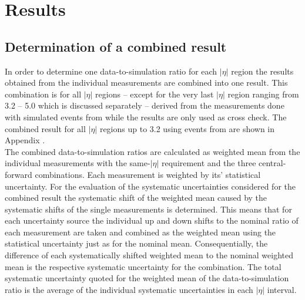 \section{Results}
\label{sec:jer_results}

\subsection{Determination of a combined result}
\label{subsec:jer_combination}
In order to determine one data-to-simulation ratio for each $|\eta|$ region the results obtained from the individual measurements are combined into one result. This combination is for all $|\eta|$ regions -- except for the very last $|\eta|$ region ranging from 3.2 -- 5.0 which is discussed separately -- derived from the measurements done with simulated events from \pythia while the \herwig results are only used as cross check. The combined result for all $|\eta|$ regions up to 3.2 using events from \herwig are shown in Appendix .\\
The combined data-to-simulation ratios are calculated as weighted mean from the individual measurements with the same-$|\eta|$ requirement and the three central-forward combinations. Each measurement is weighted by its' statistical uncertainty. For the evaluation of the systematic uncertainties considered for the combined result the systematic shift of the weighted mean caused by the systematic shifts of the single measurements is determined. This means that for each uncertainty source the individual up and down shifts to the nominal ratio of each measurement are taken and combined as the weighted mean using the statistical uncertainty just as for the nominal mean. Consequentially, the difference of each systematically shifted weighted mean to the nominal weighted mean is the respective systematic uncertainty for the combination. The total systematic uncertainty quoted for the weighted mean of the data-to-simulation ratio is the average of the individual systematic uncertainties in each $|\eta|$ interval.\\

